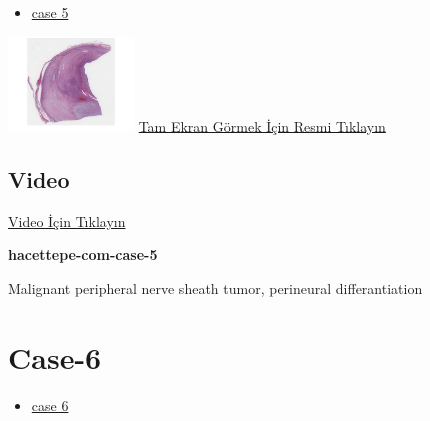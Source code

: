 \documentclass[
  letterpaper,
  DIV=11,
  numbers=noendperiod]{scrreprt}
\providecommand{\tightlist}{%
  \setlength{\itemsep}{0pt}\setlength{\parskip}{0pt}}\usepackage{longtable,booktabs,array}
\begin{document}
\begin{itemize}
\tightlist
\item
  \href{https://www.youtube.com/watch?v=o13qcP56mqg\&ab_channel=KemalKosemehmetoglu}{case
  5}
\end{itemize}

\href{https://images.patolojiatlasi.com/hacettepe-com-case-5/HE.html}{\includegraphics[width=0.25\textwidth,height=\textheight]{./screenshots/thumbnail_hacettepe-com-case-5.png}}
\href{https://images.patolojiatlasi.com/hacettepe-com-case-5/HE.html}{Tam
Ekran Görmek İçin Resmi Tıklayın}

\hypertarget{video-3}{%
\subsection{Video}\label{video-3}}

\href{https://www.youtube.com/watch?v=o13qcP56mqg}{Video İçin Tıklayın}

\textbf{hacettepe-com-case-5}

\begin{tcolorbox}[enhanced jigsaw, colbacktitle=quarto-callout-tip-color!10!white, colback=white, titlerule=0mm, opacityback=0, colframe=quarto-callout-tip-color-frame, opacitybacktitle=0.6, bottomrule=.15mm, breakable, coltitle=black, title=\textcolor{quarto-callout-tip-color}{\faLightbulb}\hspace{0.5em}{Tanı}, toprule=.15mm, toptitle=1mm, bottomtitle=1mm, arc=.35mm, rightrule=.15mm, leftrule=.75mm, left=2mm]

Malignant peripheral nerve sheath tumor, perineural differantiation

\end{tcolorbox}

\hypertarget{sec-hacettepe-case-of-the-month-case-6}{%
\section{Case-6}\label{sec-hacettepe-case-of-the-month-case-6}}

\begin{itemize}
\tightlist
\item
  \href{https://www.youtube.com/watch?v=ipjRs0h1PnY\&ab_channel=KemalKosemehmetoglu}{case
  6}
\end{itemize}
\end{document}
